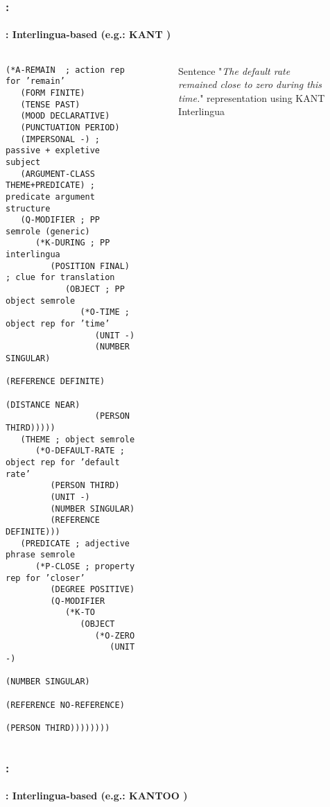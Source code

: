 \documentclass[xcolor=table]{beamer}
\begin{document}
\begin{frame}[fragile]
	\frametitle{\insertshortsubtitle: \insertsection}
	\framesubtitle{\insertsubsection: Interlingua-based (e.g.: KANT \cite{98-czuba-al})}
	
	\begin{columns}
	\begin{column}{0.5\textwidth}
	\bfseries\fontsize{4}{5}\selectfont
\begin{verbatim}
(*A-REMAIN  ; action rep for ’remain’
   (FORM FINITE)
   (TENSE PAST)
   (MOOD DECLARATIVE)
   (PUNCTUATION PERIOD)
   (IMPERSONAL -) ; passive + expletive subject
   (ARGUMENT-CLASS THEME+PREDICATE) ; predicate argument structure
   (Q-MODIFIER ; PP semrole (generic)
      (*K-DURING ; PP interlingua
         (POSITION FINAL) ; clue for translation
            (OBJECT ; PP object semrole
               (*O-TIME ; object rep for ’time’
                  (UNIT -)
                  (NUMBER SINGULAR)
                  (REFERENCE DEFINITE)
                  (DISTANCE NEAR)
                  (PERSON THIRD)))))
   (THEME ; object semrole
      (*O-DEFAULT-RATE ; object rep for ’default rate’
         (PERSON THIRD)
         (UNIT -)
         (NUMBER SINGULAR)
         (REFERENCE DEFINITE)))
   (PREDICATE ; adjective phrase semrole
      (*P-CLOSE ; property rep for ’closer’
         (DEGREE POSITIVE)
         (Q-MODIFIER
            (*K-TO
               (OBJECT
                  (*O-ZERO
                     (UNIT -)
                     (NUMBER SINGULAR)
                     (REFERENCE NO-REFERENCE)
                     (PERSON THIRD))))))))
\end{verbatim}
	\end{column}
	\begin{column}{0.5\textwidth}
		\begin{figure}
			\caption{Sentence "\textit{The default rate remained close to zero during this time.}" representation using KANT Interlingua \cite{98-czuba-al}}
		\end{figure}
	\end{column}
	\end{columns}

\end{frame}

\begin{frame}[fragile]
	\frametitle{\insertshortsubtitle: \insertsection}
	\framesubtitle{\insertsubsection: Interlingua-based (e.g.: KANTOO \cite{00-nyberg-al})}
	
	
\end{frame}
\end{document}
